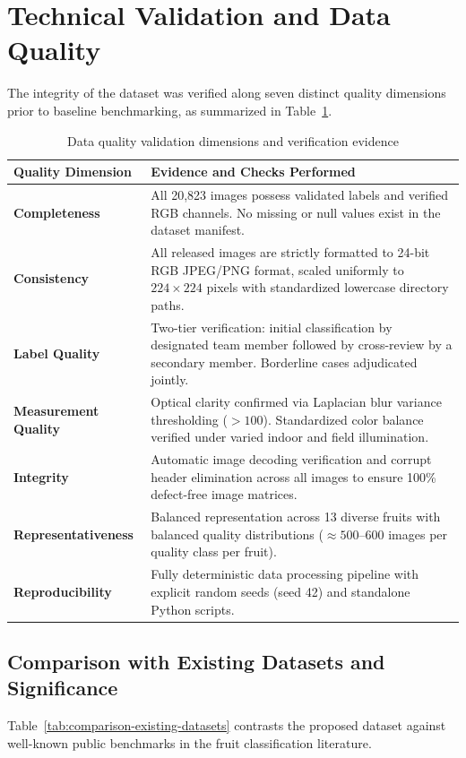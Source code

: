 \documentclass[11pt,a4paper]{article}
\begin{document}
\section{Technical Validation and Data Quality}
The integrity of the dataset was verified along seven distinct quality dimensions prior to baseline benchmarking, as summarized in Table~\ref{tab:data-quality-checks}.

\begin{table}[H]
\centering\small
\begin{tabular}{|p{}|p{}|}
\hline
\textbf{Quality Dimension} & \textbf{Evidence and Checks Performed} \\
\hline
\textbf{Completeness} & All 20,823 images possess validated labels and verified RGB channels. No missing or null values exist in the dataset manifest. \\ \hline
\textbf{Consistency} & All released images are strictly formatted to 24-bit RGB JPEG/PNG format, scaled uniformly to $224 \times 224$ pixels with standardized lowercase directory paths. \\ \hline
\textbf{Label Quality} & Two-tier verification: initial classification by designated team member followed by cross-review by a secondary member. Borderline cases adjudicated jointly. \\ \hline
\textbf{Measurement Quality} & Optical clarity confirmed via Laplacian blur variance thresholding ($> 100$). Standardized color balance verified under varied indoor and field illumination. \\ \hline
\textbf{Integrity} & Automatic image decoding verification and corrupt header elimination across all images to ensure 100\% defect-free image matrices. \\ \hline
\textbf{Representativeness} & Balanced representation across 13 diverse fruits with balanced quality distributions ($\approx 500$--$600$ images per quality class per fruit). \\ \hline
\textbf{Reproducibility} & Fully deterministic data processing pipeline with explicit random seeds (seed 42) and standalone Python scripts. \\ \hline
\end{tabular}
\caption{Data quality validation dimensions and verification evidence}
\label{tab:data-quality-checks}
\end{table}

\subsection{Comparison with Existing Datasets and Significance}
Table~\ref{tab:comparison-existing-datasets} contrasts the proposed dataset against well-known public benchmarks in the fruit classification literature.
\end{document}
